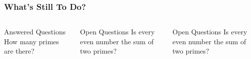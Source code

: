 \begin{frame}
\frametitle{What’s Still To Do?}
\begin{columns}
\begin{block}{Answered Questions}
How many primes are there?
\end{block}
\begin{block}{Open Questions}
Is every even number the sum of two primes?
\end{block}
\begin{block}{Open Questions}
Is every even number the sum of two primes?
\cite{Goldbach1742}
\end{block}
\end{columns}
\end{frame}



